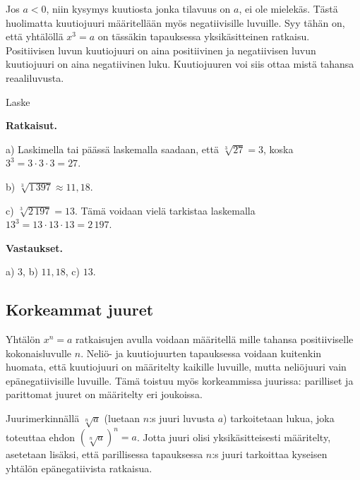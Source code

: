
Jos $a<0$, niin kysymys kuutiosta jonka tilavuus on $a$, ei ole mielekäs. Tästä huolimatta kuutiojuuri määritellään myös negatiivisille luvuille. Syy tähän on, että yhtälöllä $x^3=a$ on tässäkin tapauksessa yksikäsitteinen ratkaisu. Positiivisen luvun kuutiojuuri on aina positiivinen ja negatiivisen luvun kuutiojuuri on aina negatiivinen luku. Kuutiojuuren voi siis ottaa mistä tahansa reaaliluvusta.


\begin{esimerkki}
Laske

{\bf Ratkaisut.}

a) Laskimella tai päässä laskemalla saadaan, että $\sqrt[3]{27} = 3$, koska  $3^3 =3\cdot 3\cdot 3=27$.

b) $\sqrt[3]{1\,397}\approx 11,18$. 

c) $\sqrt[3]{2\,197}=13$.
Tämä voidaan vielä tarkistaa laskemalla $13^3 = 13\cdot 13\cdot 13=2\,197$.

{\bf Vastaukset.}

a) $3$, b) $11,18$, c) $13$.
\end{esimerkki}

\subsection*{Korkeammat juuret}

Yhtälön $x^n=a$ ratkaisujen avulla voidaan määritellä  mille tahansa positiiviselle kokonaisluvulle $n$. Neliö- ja kuutiojuurten tapauksessa voidaan kuitenkin huomata, että kuutiojuuri on määritelty kaikille luvuille, mutta neliöjuuri vain epänegatiivisille luvuille. Tämä toistuu myös korkeammissa juurissa: parilliset ja parittomat juuret on määritelty eri joukoissa.

Juurimerkinnällä $\sqrt[n]{a}$ (luetaan $n$:s juuri luvusta $a$) tarkoitetaan lukua, joka toteuttaa ehdon $(\sqrt[n]{a})^n = a$. Jotta juuri olisi yksikäsitteisesti määritelty, asetetaan lisäksi, että parillisessa tapauksessa $n$:s juuri tarkoittaa kyseisen yhtälön epänegatiivista ratkaisua.


